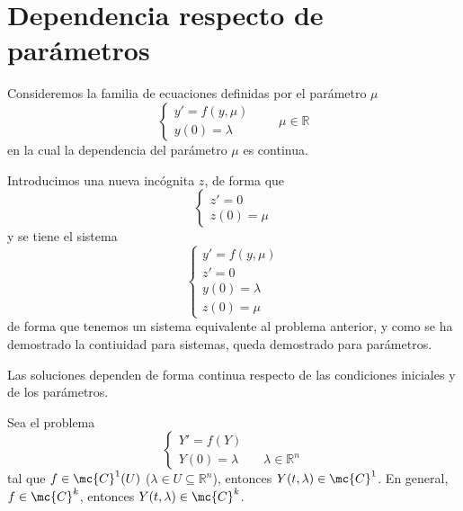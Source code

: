 \section{Dependencia respecto de parámetros}
Consideremos la familia de ecuaciones definidas por el parámetro $\mu$
$$\left\{ \begin{array}{l}
     y'=f(y,\mu)  \\
     y(0)=\lambda
\end{array} \right. \qquad \mu \in \mathbb R$$
en la cual la dependencia del parámetro $\mu$ es continua.
\begin{dem}
    Introducimos una nueva incógnita $z$, de forma que 
    $$\left\{ \begin{array}{l}
     z'=0  \\
     z(0)=\mu
\end{array} \right.$$
y se tiene el sistema
$$\left\{ \begin{array}{l}
     y'=f(y,\mu)  \\
     z'=0 \\ 
     y(0)=\lambda \\
     z(0)=\mu
\end{array} \right.$$
de forma que tenemos un sistema equivalente al problema anterior, y como se ha demostrado la contiuidad para sistemas, queda demostrado para parámetros. 
\end{dem}
\begin{cor}
    Las soluciones dependen de forma continua respecto de las condiciones iniciales y de los parámetros.
\end{cor}
\begin{teo}
    Sea el problema 
    $$\left\{ \begin{array}{l}
     Y'=f(Y)  \\
     Y(0)=\lambda \qquad \lambda \in \mathbb R^n
\end{array} \right.$$
tal que $f \in \mc{C}^1(U)$ ($\lambda \in U \subseteq \mathbb R^n$), entonces $Y(t,\lambda) \in \mc{C}^1$. En general, $f \in \mc{C}^k$, entonces $Y(t,\lambda) \in \mc{C}^k$.
\end{teo}
